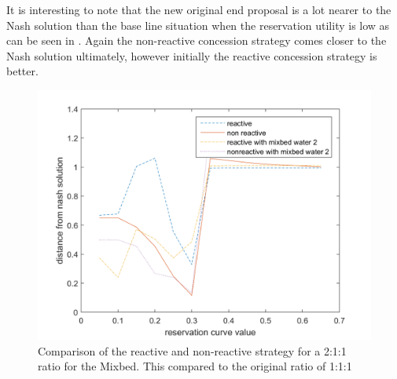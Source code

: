 It is interesting to note that the new original end proposal is a lot nearer to the Nash solution than the base line situation when the reservation utility is low as can be seen in . Again the non-reactive concession strategy comes closer to the Nash solution ultimately, however initially the reactive concession strategy is better. 
\begin{figure}[h]
	\centering
	\includegraphics[width=0.7\linewidth]{img/reactivevsnonreactiveMixbed2.png}
	\caption{Comparison of the reactive and non-reactive strategy for a 2:1:1 ratio for the Mixbed. This compared to the original ratio of 1:1:1}
	\label{fig:reactivevsnon-reactiveMixbed2}
\end{figure}


